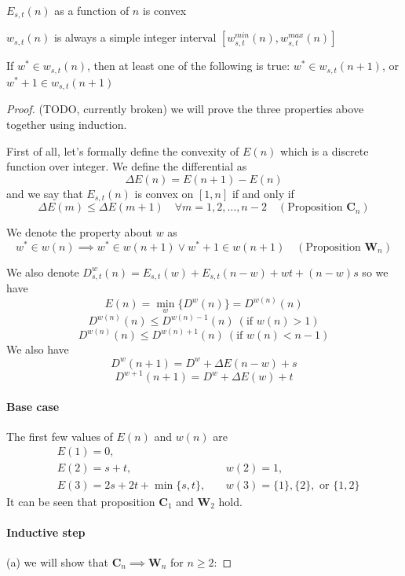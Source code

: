 \documentclass[]{article}
\begin{document}
\hspace{1cm}
\begin{lemma}
$E_{s,t}(n)$ as a function of $n$ is convex
\end{lemma}
\begin{lemma}
	$w_{s,t}(n)$ is always a simple integer interval $[w_{s,t}^{min}(n), w_{s,t}^{max}(n)]$
\end{lemma}
\begin{lemma}
	If $w^*\in w_{s,t}(n)$, then at least one of the following is true: $w^*\in w_{s,t}(n+1)$, or $w^*+1\in w_{s,t}(n+1)$
\end{lemma}
\begin{proof}
(TODO, currently broken)
we will prove the three properties above together using induction.

First of all, let's formally define the convexity of $E(n)$ which is a discrete function over integer. We define the differential as
\[  
\Delta E(n) = E(n+1) - E(n)
\]
and we say that $E_{s,t}(n)$ is convex on $[1,n]$ if and only if
\[
 \Delta E(m)\le \Delta E(m+1)\quad\forall m = 1,2,\dots,n-2\quad (\text{Proposition } \mathbf{C}_n)
\]

We denote the property about $w$ as
\[
w^*\in w(n) \implies w^* \in w(n+1) \lor w^*+1 \in w(n+1) \quad (\text{Proposition } \mathbf{W}_n)
\]

We also denote $D^w_{s,t}(n) = E_{s,t}(w) + E_{s,t}(n-w) +wt+(n-w)s$ so we have
\[
E(n) = \min_w\{D^w(n)\} = D^{w(n)}(n)
\]
\[
D^{w(n)}(n) \le D^{w(n) - 1}(n)\  (\text{if } w(n) > 1)
\]
\[
D^{w(n)}(n) \le D^{w(n) + 1}(n)\  (\text{if } w(n) < n - 1)
\]
We also have 
\[
D^{w}(n+1) = D^{w} + \Delta E(n-w) +s
\]
\[
D^{w+1}(n+1) = D^{w} + \Delta E(w) +t
\]


\paragraph{Base case}
The first few values of $E(n)$ and $w(n)$ are 
\begin{align*}
&E(1) = 0,\ &&\\
&E(2) = s + t, \ &&w(2) = 1,\\
&E(3) = 2s + 2t + \min\{s, t\}, \ &&w(3) = \{1\}, \{2\},\text{ or }\{1,2\}
\end{align*}
It can be seen that proposition $\mathbf{C}_1$ and $\mathbf{W}_2$ hold.

\paragraph{Inductive step} (a) we will show that $\mathbf{C}_n \implies \mathbf{W}_n$ for $n\ge 2$:


\end{proof}
\end{document}
